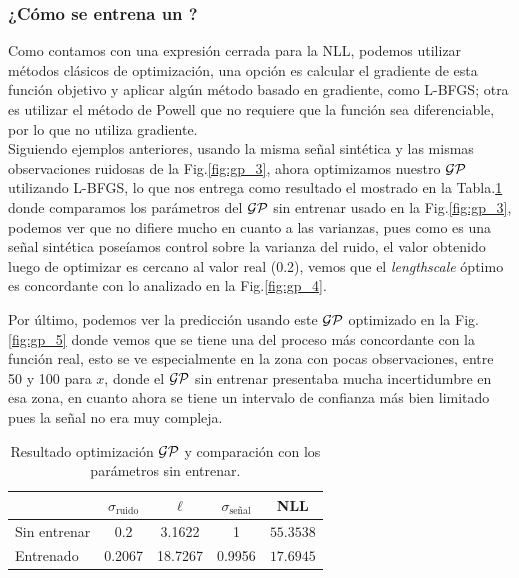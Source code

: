 \subsubsection{¿Cómo se entrena un \gp?}

Como contamos con una expresión cerrada para la NLL, podemos utilizar métodos clásicos de optimización, una opción es calcular el gradiente de esta función objetivo y aplicar algún método basado en gradiente, como L-BFGS; otra es utilizar el método de Powell que no requiere que la función sea diferenciable, por lo que no utiliza gradiente.\\


Siguiendo ejemplos anteriores, usando la misma señal sintética y las mismas observaciones ruidosas de la Fig.\ref{fig:gp_3}, ahora optimizamos nuestro $\mathcal{GP}$ utilizando L-BFGS, lo que nos entrega como resultado el mostrado en la Tabla.\ref{tab:gp_1} donde comparamos los parámetros del $\mathcal{GP}$ sin entrenar usado en la Fig.\ref{fig:gp_3}, podemos ver que no difiere mucho en cuanto a las varianzas, pues como es una señal sintética poseíamos control sobre la varianza del ruido, el valor obtenido luego de optimizar es cercano al valor real (0.2), vemos que el \textit{lengthscale} óptimo es concordante con lo analizado en la Fig.\ref{fig:gp_4}.

Por último, podemos ver la predicción usando este $\mathcal{GP}$ optimizado en la Fig.\ref{fig:gp_5} donde vemos que se tiene una del proceso más concordante con la función real, esto se ve especialmente en la zona con pocas observaciones, entre 50 y 100 para $x$, donde el $\mathcal{GP}$ sin entrenar presentaba mucha incertidumbre en esa zona, en cuanto ahora se tiene un intervalo de confianza más bien limitado pues la señal no era muy compleja.

\begin{table}[H]
\centering
\begin{tabular}{lcccc}
 & $\sigma_{\text{ruido}}$ & $\ell$ & $\sigma_{\text{señal}}$ & NLL\\ \hline
Sin entrenar & 0.2 & 3.1622 & 1 & $\mathbf{55.3538}$\\
Entrenado & 0.2067 & 18.7267 & 0.9956 & $\mathbf{17.6945}$\\
\end{tabular}
\caption{Resultado optimización $\mathcal{GP}$ y comparación con los parámetros sin entrenar.}
\label{tab:gp_1}
\end{table}


